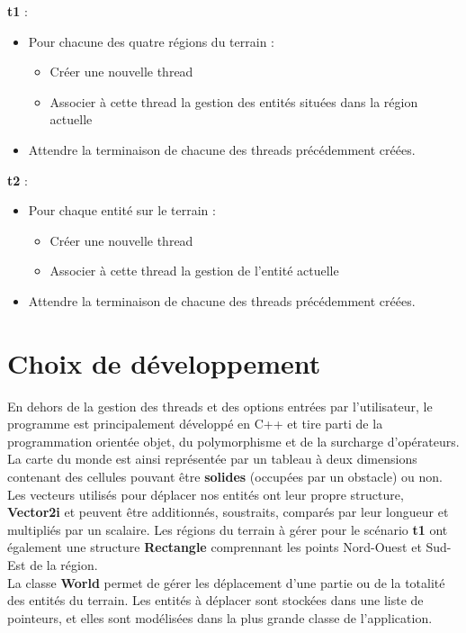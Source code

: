 \documentclass[11pt]{article} %
\begin{document}
\textbf{t1} :
\begin{itemize}
\item Pour chacune des quatre régions du terrain :
	\begin{itemize}
		\item Créer une nouvelle thread
		\item Associer à cette thread la gestion des entités situées dans la région actuelle
	\end{itemize}

\item Attendre la terminaison de chacune des threads précédemment créées.

\end{itemize} 
 
\textbf{t2} :
\begin{itemize}
\item Pour chaque entité sur le terrain :
	\begin{itemize}
		\item Créer une nouvelle thread
		\item Associer à cette thread la gestion de l'entité actuelle
	\end{itemize}

\item Attendre la terminaison de chacune des threads précédemment créées.

\end{itemize}

\section{Choix de développement}
En dehors de la gestion des threads et des options entrées par l'utilisateur, le programme est principalement développé en C++ et tire parti de la programmation orientée objet, du polymorphisme et de la surcharge d'opérateurs. \\
La carte du monde est ainsi représentée par un tableau à deux dimensions contenant des cellules pouvant être \textbf{solides} (occupées par un obstacle) ou non. \\
Les vecteurs utilisés pour déplacer nos entités ont leur propre structure, \textbf{Vector2i} et peuvent être additionnés, soustraits, comparés par leur longueur et multipliés par un scalaire. Les régions du terrain à gérer pour le scénario \textbf{t1} ont également une structure \textbf{Rectangle} comprennant les points Nord-Ouest et Sud-Est de la région. \\
La classe \textbf{World} permet de gérer les déplacement d'une partie ou de la totalité des entités du terrain. Les entités à déplacer sont stockées dans une liste de pointeurs, et elles sont modélisées dans la plus grande classe de l'application.
\end{document}
